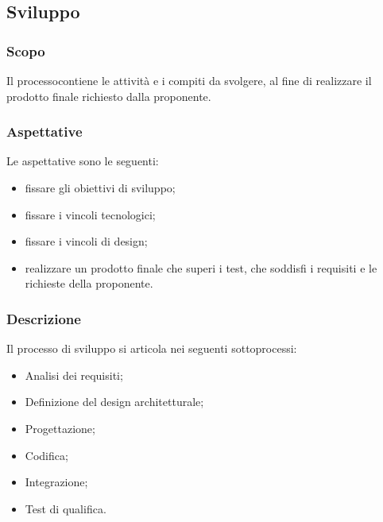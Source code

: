 		\begin{comment} 
		\textbf{(questa ultima sezione è da inserire nella fase successiva)}
		\subsubsection{Collaudo e consegna del prodotto}
		Al fine di consegnare il prodotto terminato il gruppo deve effettuare un collaudo in presenza del proponente e dei committenti. Precedentemente a questo test il gruppo deve assicurare correttezza, completezza e affidabilità per ogni parte del materiale consegnato, permettendo così che tutti i requisiti obbligatori siano soddisfatti e l'esecuzione dei test abbiano un esito positivo. In seguito al collaudo finale il responsabile di progetto consegna il prodotto su un supporto fisico.
		\end{comment}  
     
\subsection{Sviluppo}
	\subsubsection{Scopo}
	Il processo\glosp contiene le attività e i compiti da svolgere, al fine di realizzare il prodotto finale richiesto dalla proponente.
	\subsubsection{Aspettative}
	Le aspettative sono le seguenti:
	\begin{itemize}
		\item fissare gli obiettivi di sviluppo;
		\item fissare i vincoli tecnologici;
		\item fissare i vincoli di design;
		\item realizzare un prodotto finale che superi i test, che soddisfi i requisiti e le richieste della proponente.
	\end{itemize}
	\subsubsection{Descrizione}
	Il processo di sviluppo si articola nei seguenti sottoprocessi:
	\begin{itemize}
		\item Analisi dei requisiti;
		\item Definizione del design architetturale;
		\item Progettazione;
		\item Codifica;
		\item Integrazione;
		\item Test di qualifica.
	\end{itemize}
